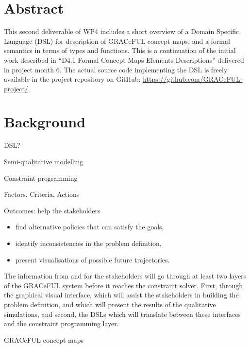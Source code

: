 \documentclass[]{article}
\begin{document}
\vfill

\tableofcontents

\vfill

\newpage

\section*{Abstract}\label{abstract}

This second deliverable of WP4 includes a short overview of a Domain
Specific Language (DSL) for description of GRACeFUL concept maps, and
a formal semantics in terms of types and functions. This is a
continuation of the initial work described in ``D4.1 Formal Concept
Maps Elements Descriptions'' delivered in project month 6. The actual
source code implementing the DSL is freely available in the project
repository on GitHub: \url{https://github.com/GRACeFUL-project/}.



\section{Background}


DSL?

Semi-qualitative modelling

Constraint programming

Factors, Criteria, Actions

Outcomes: help the stakeholders

\begin{itemize}
\item find alternative policies that can satisfy the goals,
\item identify inconsistencies in the problem definition,
\item  present visualisations of possible future trajectories.
\end{itemize}

The information from and for the stakeholders will go through at least
two layers of the GRACeFUL system before it reaches the constraint
solver. First, through the graphical visual interface, which will
assist the stakeholders in building the problem definition, and which
will present the results of the qualitative simulations, and second,
the DSLs which will translate between these interfaces and the
constraint programming layer.

GRACeFUL concept maps
\end{document}
